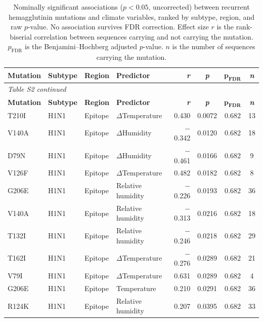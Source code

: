 \documentclass[12pt]{article}
\begin{document}
\begin{longtable}{llllrccc}
    \caption{Nominally significant associations ($p < 0.05$, uncorrected) between recurrent hemagglutinin mutations and climate variables, ranked by subtype, region, and raw $p$-value. No association survives FDR correction. Effect size $r$ is the rank-biserial correlation between sequences carrying and not carrying the mutation. $p_{\text{FDR}}$ is the Benjamini--Hochberg adjusted $p$-value. $n$ is the number of sequences carrying the mutation.}
    \label{tab:s3_mutations} \\
    \toprule
    \textbf{Mutation} & \textbf{Subtype} & \textbf{Region} & \textbf{Predictor} & \textbf{\textit{r}} & \textbf{\textit{p}} & $\boldsymbol{p_{\text{FDR}}}$ & \textbf{\textit{n}} \\
    \midrule
    \endfirsthead
    \multicolumn{8}{l}{\small\textit{Table S2 continued}} \\
    \toprule
    \textbf{Mutation} & \textbf{Subtype} & \textbf{Region} & \textbf{Predictor} & \textbf{\textit{r}} & \textbf{\textit{p}} & $\boldsymbol{p_{\text{FDR}}}$ & \textbf{\textit{n}} \\
    \midrule
    \endhead
    \bottomrule
    \endlastfoot
        T210I & H1N1 & Epitope & $\Delta$Temperature & 0.430 & 0.0072 & 0.682 & 13 \\
        V140A & H1N1 & Epitope & $\Delta$Humidity & $-$0.342 & 0.0120 & 0.682 & 18 \\
        D79N & H1N1 & Epitope & $\Delta$Humidity & $-$0.461 & 0.0166 & 0.682 & 9 \\
        V126F & H1N1 & Epitope & $\Delta$Temperature & 0.482 & 0.0182 & 0.682 & 8 \\
        G206E & H1N1 & Epitope & Relative humidity & $-$0.226 & 0.0193 & 0.682 & 36 \\
        V140A & H1N1 & Epitope & Relative humidity & $-$0.313 & 0.0216 & 0.682 & 18 \\
        T132I & H1N1 & Epitope & Relative humidity & $-$0.246 & 0.0218 & 0.682 & 29 \\
        T162I & H1N1 & Epitope & $\Delta$Temperature & $-$0.276 & 0.0289 & 0.682 & 21 \\
        V79I & H1N1 & Epitope & $\Delta$Temperature & 0.631 & 0.0289 & 0.682 & 4 \\
        G206E & H1N1 & Epitope & Temperature & 0.210 & 0.0291 & 0.682 & 36 \\
        R124K & H1N1 & Epitope & Relative humidity & 0.207 & 0.0395 & 0.682 & 33 \\

\end{longtable}
\end{document}
